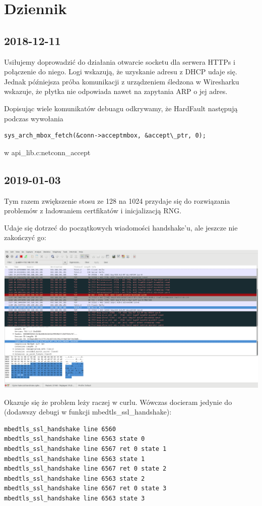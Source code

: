 \newpage
\section{Dziennik}

\subsection{2018-12-11}
Usiłujemy doprowadzić do działania otwarcie socketu dla serwera HTTPs i połączenie do niego.
Logi wskazują, że uzyskanie adresu z DHCP udaje się. Jednak późniejsza próba komunikacji 
z urządzeniem śledzona w Wiresharku wskazuje, że płytka nie odpowiada nawet na zapytania ARP o 
jej adres.

Dopisując wiele komunikatów debuagu odkrywamy, że HardFault następują podczas 
wywołania 
\begin{verbatim}
sys_arch_mbox_fetch(&conn->acceptmbox, &accept\_ptr, 0);
\end{verbatim}
w api\_lib.c:netconn\_accept
 

\subsection{2019-01-03}
Tym razem zwiększenie stosu ze 128 na 1024 przydaje się do rozwiązania problemów z ładowaniem 
certfikatów i inicjalizacją RNG.

Udaje się dotrzeć do początkowych wiadomości handshake’u, ale jeszcze nie zakończyć go:

\includegraphics[width=\linewidth]{./images/1.png}


Okazuje się że problem leży raczej w curlu. Wówczas docieram jedynie do (dodawszy debugi w 
funkcji mbedtls\_ssl\_handshake):

\begin{verbatim}
mbedtls_ssl_handshake line 6560
mbedtls_ssl_handshake line 6563 state 0
mbedtls_ssl_handshake line 6567 ret 0 state 1
mbedtls_ssl_handshake line 6563 state 1
mbedtls_ssl_handshake line 6567 ret 0 state 2
mbedtls_ssl_handshake line 6563 state 2
mbedtls_ssl_handshake line 6567 ret 0 state 3
mbedtls_ssl_handshake line 6563 state 3
\end{verbatim}

